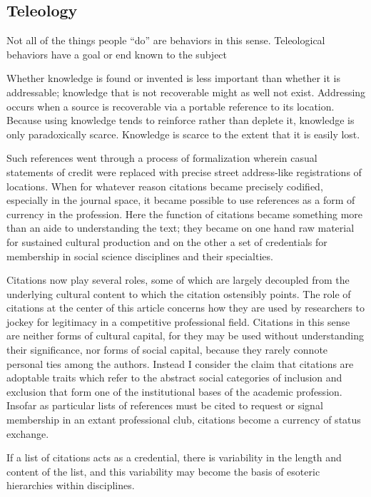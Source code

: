\documentclass[]{article}
\begin{document}
\subsection{Teleology}\label{teleology}

Not all of the things people ``do'' are behaviors in this sense.
Teleological behaviors have a goal or end known to the subject

Whether knowledge is found or invented is less important than whether it
is addressable; knowledge that is not recoverable might as well not
exist. Addressing occurs when a source is recoverable via a portable
reference to its location. Because using knowledge tends to reinforce
rather than deplete it, knowledge is only paradoxically scarce.
Knowledge is scarce to the extent that it is easily lost.

Such references went through a process of formalization wherein casual
statements of credit were replaced with precise street address-like
registrations of locations. When for whatever reason citations became
precisely codified, especially in the journal space, it became possible
to use references as a form of currency in the profession. Here the
function of citations became something more than an aide to
understanding the text; they became on one hand raw material for
sustained cultural production and on the other a set of credentials for
membership in social science disciplines and their specialties.

Citations now play several roles, some of which are largely decoupled
from the underlying cultural content to which the citation ostensibly
points. The role of citations at the center of this article concerns how
they are used by researchers to jockey for legitimacy in a competitive
professional field. Citations in this sense are neither forms of
cultural capital, for they may be used without understanding their
significance, nor forms of social capital, because they rarely connote
personal ties among the authors. Instead I consider the claim that
citations are adoptable traits which refer to the abstract social
categories of inclusion and exclusion that form one of the institutional
bases of the academic profession. Insofar as particular lists of
references must be cited to request or signal membership in an extant
professional club, citations become a currency of status exchange.

If a list of citations acts as a credential, there is variability in the
length and content of the list, and this variability may become the
basis of esoteric hierarchies within disciplines.
\end{document}
